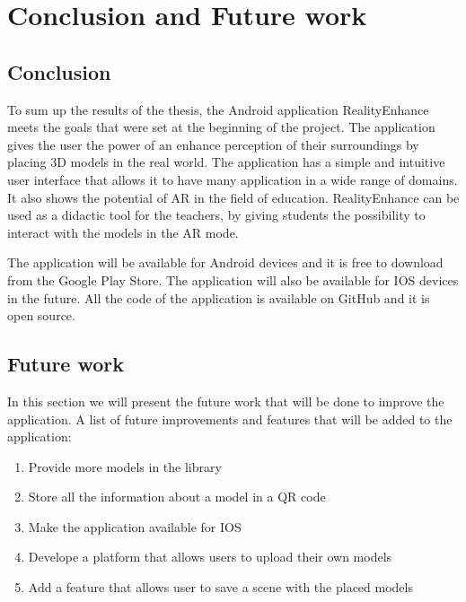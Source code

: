 \chapter{Conclusion and Future work}\label{cap:conclusion}

\section{Conclusion}
To sum up the results of the thesis, the Android application RealityEnhance meets the goals that were set at the beginning of the project. The application gives the user the power of an enhance perception of their surroundings by placing \ac{3D} models in the real world. The application has a simple and intuitive user interface that allows it to have many application in a wide range of domains. It also shows the potential of \ac{AR} in the field of education. RealityEnhance can be used as a didactic tool for the teachers, by giving students the possibility to interact with the models in the \ac{AR} mode.

The application will be available for Android devices and it is free to download from the Google Play Store. The application will also be available for IOS devices in the future. All the code of the application is available on GitHub\cite{RealityEnhance} and it is open source.



\section{Future work}
In this section we will present the future work that will be done to improve the application.
A list of future improvements and features that will be added to the application:
\begin{enumerate}
    \item{Provide more models in the library}
    \item{Store all the information about a model in a QR code}
    \item{Make the application available for IOS}
    \item{Develope a platform that allows users to upload their own models}
    \item{Add a feature that allows user to save a scene with the placed models}
\end{enumerate}
